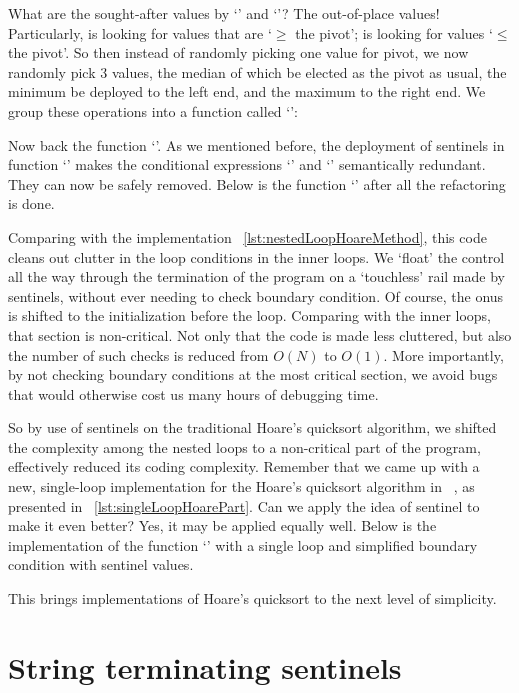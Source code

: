 What are the sought-after values by `' and `'?
The out-of-place values!
Particularly,  is looking for values that are `$\geq$ the pivot';
 is looking for values `$\leq$ the pivot'.
So then instead of randomly picking one value for pivot, we now randomly pick $3$ values, the median
of which be elected as the pivot as usual, the minimum be deployed to the left end, and the maximum
to the right end.
We group these operations into a function called `':



Now back the function `'.
As we mentioned before, the deployment of sentinels in function `' makes
the conditional expressions `' and `' semantically redundant.
They can now be safely removed.
Below is the function `' after all the refactoring is done.

Comparing with the implementation ~\autoref{lst:nestedLoopHoareMethod}, this code
cleans out clutter in the loop conditions in the inner loops.
We `float' the control all the way through the termination of the program on a `touchless' rail made
by sentinels, without ever needing to check boundary condition.
Of course, the onus is shifted to the initialization before the loop.
Comparing with the inner loops, that section is non-critical.
Not only that the code is made less cluttered, but also the number of such checks
is reduced from $O(N)$ to $O(1)$.
More importantly, by not checking boundary conditions at the most critical section,
we avoid bugs that would otherwise cost us many hours of debugging time.


So by use of sentinels on the traditional Hoare's quicksort algorithm,
we shifted the complexity among the nested loops to a non-critical part of the program,
effectively reduced its coding complexity.
Remember that we came up with a new, single-loop implementation for the Hoare's quicksort algorithm
in ~, as presented in ~\autoref{lst:singleLoopHoarePart}.
Can we apply the idea of sentinel to make it even better?
Yes, it may be applied equally well.
Below is the implementation of the function `' with a single loop and simplified
boundary condition with sentinel values.

This brings implementations of Hoare's quicksort to the next level of simplicity.


\section{String terminating sentinels}\label{sec:stringTerminationSentinels}

